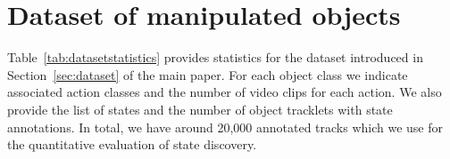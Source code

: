 \section{Dataset of manipulated objects}
\label{app:dataset}

Table~\ref{tab:datasetstatistics} provides statistics for the dataset introduced in Section~\ref{sec:dataset} of the main paper.
For each object class we indicate associated action classes and the number of video clips for each action.
We also provide the list of states and the number of object tracklets with state annotations.
In total, we have around 20,000 annotated tracks which we use for the quantitative evaluation of state discovery.

\begin{table}[h!]
\centering
{}
\caption{Statistics of our new dataset of manipulated objects \label{tab:datasetstatistics}}
\end{table}
